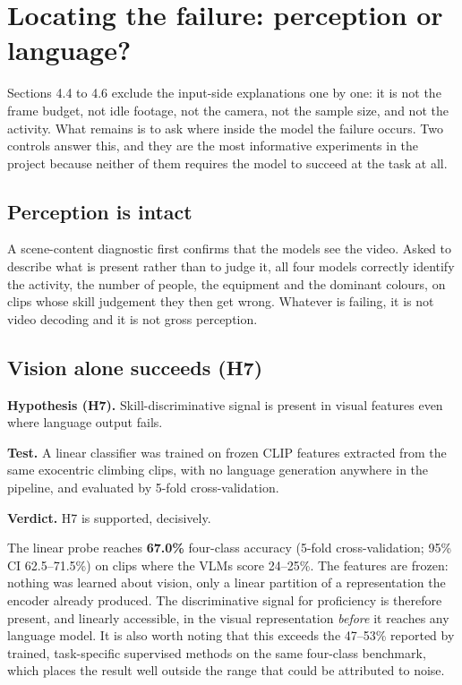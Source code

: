\documentclass[logo,msc]{infthesis}
\newcommand{\runin}[1]{\par\medskip\noindent\textbf{#1}}
\begin{document}
\section{Locating the failure: perception or language?}

Sections 4.4 to 4.6 exclude the input-side explanations one by one: it is
not the frame budget, not idle footage, not the camera, not the sample
size, and not the activity. What remains is to ask where inside the model
the failure occurs. Two controls answer this, and they are the most
informative experiments in the project because neither of them requires the
model to succeed at the task at all.

\subsection{Perception is intact}

A scene-content diagnostic first confirms that the models see the video.
Asked to describe what is present rather than to judge it, all four models
correctly identify the activity, the number of people, the equipment and
the dominant colours, on clips whose skill judgement they then get wrong.
Whatever is failing, it is not video decoding and it is not gross
perception.

\subsection{Vision alone succeeds (H7)}

\runin{Hypothesis (H7).} Skill-discriminative signal is present in
visual features even where language output fails.

\runin{Test.} A linear classifier was trained on frozen CLIP features
extracted from the same exocentric climbing clips, with no language
generation anywhere in the pipeline, and evaluated by 5-fold
cross-validation.

\runin{Verdict.} H7 is supported, decisively.

The linear probe reaches \textbf{67.0\%} four-class accuracy (5-fold
cross-validation; 95\% CI 62.5--71.5\%) on clips where the VLMs score
24--25\%. The
features are frozen: nothing was learned about vision, only a linear
partition of a representation the encoder already produced. The
discriminative signal for proficiency is therefore present, and linearly
accessible, in the visual representation \emph{before} it reaches any
language model. It is also worth noting that this exceeds the 47--53\%
reported by trained, task-specific supervised methods on the same
four-class benchmark, which places the result well outside the range that
could be attributed to noise.
\end{document}
